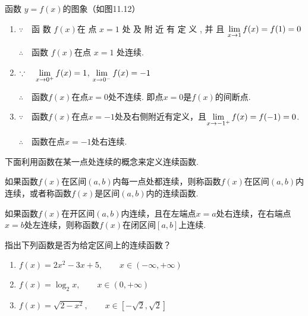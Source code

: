 \begin{solution}
    函数 $y=f(x)$的图象（如图11.12）

\noindent
\begin{minipage}{.58\textwidth}
\begin{enumerate}[(1)]
    \item $\because\quad $函 数 $f( x)$在 点 $x= 1$ 处 及 附 近 有 定 义 , 并 且 $\lim\limits_{x\to 1}f( x) = f(1)=0$

$\therefore\quad $函数 $f(x)$在点 $x=1$ 处连续.
\item $\because\quad \lim\limits_{x\to 0^+}f(x)=1$, $\lim\limits_{x\to 0^-} f(x)=-1$

$\therefore\quad $函数$f(x)$在点$x=0$处不连续. 即点$x=0$是$f(x)$的间断点.
\item $\because\quad $函数$f(x)$在点$x=-1$处及右侧附近有定义，且$\lim\limits_{x\to -1^+} f(x)=f(-1)=0$.

$\therefore\quad $函数在点$x=-1$处右连续.
\end{enumerate}    
\end{minipage}\hfill
\begin{minipage}{.4\textwidth}
\centering
{}
\end{minipage}    
\end{solution}

下面利用函数在某一点处连续的概念来定义连续函数.

如果函数$f(x)$在区间$(a,b)$内每一点处都连续，则称函数$f(x)$在区间$(a,b)$内连续，或者称函数$f(x)$是区间$(a,b)$内的连续函数.

如果函数$f(x)$在开区间$(a,b)$内连续，且在左端点$x=a$处右连续，在右端点$x=b$处左连续，则称函数$f(x)$在闭区间$[a,b]$上连续.

\begin{example}
    指出下列函数是否为给定区间上的连续函数？
\begin{enumerate}[(1)]
    \item $f(x)=2x^2-3x+5,\qquad x\in (-\infty,+\infty)$
    \item $f(x)=\log_2 x,\qquad x\in (0,+\infty)$
    \item $f(x)=\sqrt{2-x^2},\qquad x\in \left[-\sqrt{2},\sqrt{2}\right]$
\end{enumerate}
\end{example}

